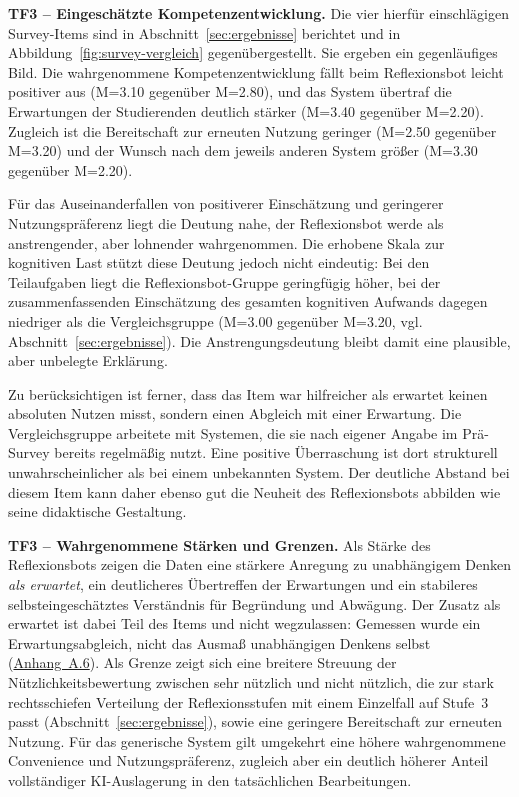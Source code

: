 \textbf{TF3 -- Eingeschätzte Kompetenzentwicklung.} Die vier hierfür einschlägigen Survey-Items sind
in Abschnitt~\ref{sec:ergebnisse} berichtet und in Abbildung~\ref{fig:survey-vergleich}
gegenübergestellt. Sie ergeben ein gegenläufiges Bild. Die wahrgenommene Kompetenzentwicklung fällt
beim Reflexionsbot leicht positiver aus (M=3.10 gegenüber M=2.80), und das System übertraf die
Erwartungen der Studierenden deutlich stärker (M=3.40 gegenüber M=2.20). Zugleich ist die Bereitschaft
zur erneuten Nutzung geringer (M=2.50 gegenüber M=3.20) und der Wunsch nach dem jeweils anderen System
größer (M=3.30 gegenüber M=2.20).

Für das Auseinanderfallen von positiverer Einschätzung und geringerer Nutzungspräferenz liegt die
Deutung nahe, der Reflexionsbot werde als anstrengender, aber lohnender wahrgenommen. Die erhobene
Skala zur kognitiven Last stützt diese Deutung jedoch nicht eindeutig: Bei den Teilaufgaben liegt die
Reflexionsbot-Gruppe geringfügig höher, bei der zusammenfassenden Einschätzung des gesamten kognitiven
Aufwands dagegen niedriger als die Vergleichsgruppe (M=3.00 gegenüber M=3.20,
vgl. Abschnitt~\ref{sec:ergebnisse}). Die Anstrengungsdeutung bleibt damit eine plausible, aber
unbelegte Erklärung.

Zu berücksichtigen ist ferner, dass das Item \glqq war hilfreicher als erwartet\grqq{} keinen
absoluten Nutzen misst, sondern einen Abgleich mit einer Erwartung. Die Vergleichsgruppe arbeitete mit
Systemen, die sie nach eigener Angabe im Prä-Survey bereits regelmäßig nutzt. Eine positive
Überraschung ist dort strukturell unwahrscheinlicher als bei einem unbekannten System. Der deutliche
Abstand bei diesem Item kann daher ebenso gut die Neuheit des Reflexionsbots abbilden wie seine
didaktische Gestaltung.

\textbf{TF3 -- Wahrgenommene Stärken und Grenzen.} Als Stärke des Reflexionsbots zeigen die Daten eine
stärkere Anregung zu unabhängigem Denken \emph{als erwartet}, ein deutlicheres Übertreffen der
Erwartungen und ein stabileres selbsteingeschätztes Verständnis für Begründung und Abwägung. Der
Zusatz \glqq als erwartet\grqq{} ist dabei Teil des Items und nicht wegzulassen: Gemessen wurde ein
Erwartungsabgleich, nicht das Ausmaß unabhängigen Denkens selbst
(\hyperref[app:statistik]{Anhang~A.6}). Als Grenze zeigt sich eine breitere Streuung der
Nützlichkeitsbewertung zwischen \glqq sehr nützlich\grqq{} und \glqq nicht nützlich\grqq{}, die zur
stark rechtsschiefen Verteilung der Reflexionsstufen mit einem Einzelfall auf Stufe~3 passt
(Abschnitt~\ref{sec:ergebnisse}), sowie eine geringere Bereitschaft zur erneuten Nutzung. Für das
generische System gilt umgekehrt eine höhere wahrgenommene Convenience und Nutzungspräferenz, zugleich
aber ein deutlich höherer Anteil vollständiger KI-Auslagerung in den tatsächlichen Bearbeitungen.

